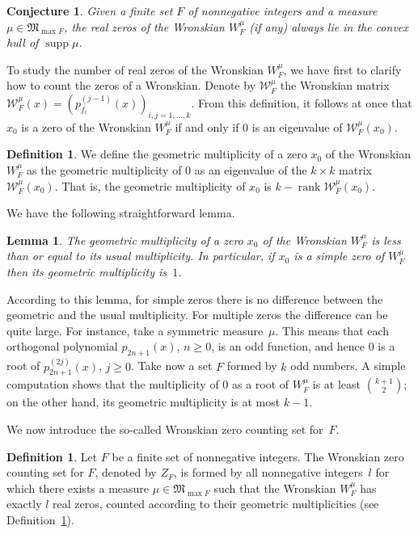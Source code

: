 \documentclass[10pt]{article}
\theoremstyle{plain}
\newtheorem{lemma}[theorem]{Lemma}
\newtheorem{conjecture}[theorem]{Conjecture}
\theoremstyle{definition}
\newtheorem{definition}[theorem]{Definition}
\numberwithin{equation}{section} %
\newcommand\W{\mathcal{W}}
\newcommand\M{\mathfrak{M}}
\newcommand\supp{\operatorname{supp}}
\newcommand\rank{\operatorname{rank}}
\begin{document}
\begin{conjecture}
Given a finite set $F$ of nonnegative integers and a measure $\mu\in \M _{\max F}$, the real zeros of the Wronskian $W_F^\mu$ (if any) always lie in the convex hull of $\supp \mu$.
\end{conjecture}

To study the number of real zeros of the Wronskian $W_F^\mu$, we have first to clarify how to count the zeros of a Wronskian. Denote by $\W _F^\mu$ the Wronskian matrix  $\W_F^\mu (x)=(p_{f_i}^{(j-1)}(x))_{i,j=1,\dots, k}$. From this definition, it follows at once that  $x_0$ is  a zero of the Wronskian $W_F^\mu$ if and only if $0$ is an eigenvalue of  $\W_F^\mu (x_0)$.

\begin{definition}\label{defgm}
We  define the geometric multiplicity of a zero $x_0$ of the Wronskian $W_F^\mu$ as the geometric multiplicity of $0$ as an eigenvalue of the $k \times k$ matrix $\W_F^\mu (x_0)$. That is, the geometric multiplicity of $x_0$ is $k-\rank \W_F^\mu (x_0)$.
\end{definition}

We have the following straightforward lemma.

\begin{lemma}
The geometric multiplicity of a zero $x_0$ of the Wronskian $W_F^\mu$ is less than or equal to its usual multiplicity. In particular, if $x_0$ is a simple zero of $W_F^\mu$ then its geometric multiplicity is~$1$.
\end{lemma}

According to this lemma, for simple zeros there is no difference between the geometric and the usual multiplicity. For multiple zeros the difference can be quite large. For instance, take a symmetric measure~$\mu$. This means that each orthogonal polynomial $p_{2n+1}(x)$, $n\ge 0$, is an odd function, and hence $0$ is a root of $p_{2n+1}^{(2j)}(x)$, $j\ge 0$. Take now  a set $F$ formed by $k$ odd numbers. A simple computation shows that the multiplicity of $0$ as a root of $W_F^\mu$ is at least  $\binom{k+1}{2}$; on the other hand, its geometric multiplicity is at most $k-1$.

We now introduce the so-called Wronskian zero counting set for~$F$.

\begin{definition}
Let $F$ be a finite set of nonnegative integers. The Wronskian zero counting set for $F$, denoted by $Z_F$, is formed by all nonnegative integers~$l$ for which there exists a measure $\mu\in \M _{\max F}$ such that the Wronskian $W_F^\mu$ has exactly $l$ real zeros, counted according to their geometric multiplicities (see Definition~\ref{defgm}).
\end{definition}
\end{document}
